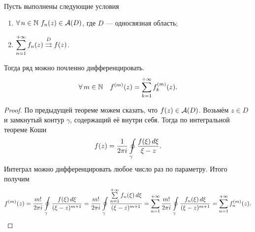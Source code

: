 	\begin{theorem}
		Пусть выполнены следующие условия
		\begin{enumerate}
			\item $\forall\,n\in\N\ f_n(z)\in\A(D)$, где $D$ --- односвязная область;
			\item $\displaystyle\sum\limits_{n=1}^{+\infty}f_n(z)\overset{D}\rightrightarrows f(z)$.
		\end{enumerate}
		Тогда ряд можно почленно дифференцировать.
		\[ \forall\,m\in\mathbb{N}\quad f^{(m)}(z) = \sum\limits_{k=1}^{+\infty}f_k^{(m)}(z). \]
	\end{theorem}
	\begin{proof}
		По предыдущей теореме можем сказать, что $f(z)\in\mathcal{A}(D)$. Возьмём $z\in D$ и замкнутый контур $\gamma$, содержащий её внутри себя. Тогда по интегральной теореме Коши
		\[ f(z) = \frac{1}{2\pi i}\oint\limits_\gamma\frac{f(\xi)\,d\xi}{\xi - z}. \]
		Интеграл можно дифференцировать любое число раз по параметру. Итого получим
		\[ f^{(m)}(z) = \frac{m!}{2\pi i}\oint\limits_\gamma\frac{f(\xi)\,d\xi}{(\xi - z)^{m+1}} = \frac{m!}{2\pi i}\oint\limits_\gamma\frac{\sum\limits_{n=1}^{+\infty}f_n(\xi)\,d\xi}{(\xi - z)^{m+1}} = \sum\limits_{n=1}^{+\infty}\frac{m!}{2\pi i}\oint\limits_\gamma\frac{f_n(\xi)\,d\xi}{(\xi - z)^{m+1}} = \sum\limits_{n=1}^{+\infty}f_n^{(m)}(z). \]
	\end{proof}
	\vspace{-\baselineskip}
